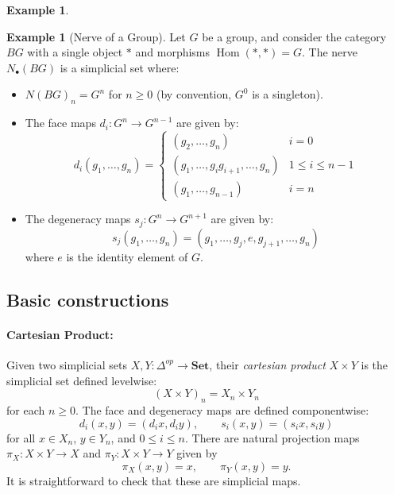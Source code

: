 \documentclass[11pt]{article}
\theoremstyle{definition}
\newtheorem{example}[definition]{Example}
\theoremstyle{plain}
\begin{document}
\begin{example}
\begin{itemize}
    \end{itemize}

\end{example}


\begin{example}[Nerve of a Group]
    Let $G$ be a group, and consider the category $BG$ with a single object $\ast$ and morphisms $\operatorname{Hom}(\ast, \ast) = G$. The nerve $N_\bullet(BG)$ is a simplicial set where:
    \begin{itemize}
        \item $N(BG)_n = G^n$ for $n \geq 0$ (by convention, $G^0$ is a singleton).
        \item The face maps $d_i : G^n \to G^{n-1}$ are given by:
              \[
                  d_i(g_1, \ldots, g_n) =
                  \begin{cases}
                      (g_2, \ldots, g_n)                      & i = 0             \\
                      (g_1, \ldots, g_i g_{i+1}, \ldots, g_n) & 1 \leq i \leq n-1 \\
                      (g_1, \ldots, g_{n-1})                  & i = n
                  \end{cases}
              \]
        \item The degeneracy maps $s_j : G^n \to G^{n+1}$ are given by:
              \[
                  s_j(g_1, \ldots, g_n) = (g_1, \ldots, g_j, e, g_{j+1}, \ldots, g_n)
              \]
              where $e$ is the identity element of $G$.
    \end{itemize}
\end{example}




\subsection{Basic constructions}

\paragraph{\textbf{Cartesian Product:}}
Given two simplicial sets $X, Y : \Delta^{op} \to \mathbf{Set}$, their \emph{cartesian product} $X \times Y$ is the simplicial set defined levelwise:
\[
    (X \times Y)_n = X_n \times Y_n
\]
for each $n \geq 0$. The face and degeneracy maps are defined componentwise:
\[
    d_i(x, y) = (d_i x, d_i y), \qquad s_i(x, y) = (s_i x, s_i y)
\]
for all $x \in X_n$, $y \in Y_n$, and $0 \leq i \leq n$.
There are natural projection maps $\pi_X : X \times Y \to X$ and $\pi_Y : X \times Y \to Y$ given by
\[
    \pi_X(x, y) = x, \qquad \pi_Y(x, y) = y.
\]
It is straightforward to check that these are simplicial maps.
\end{document}
